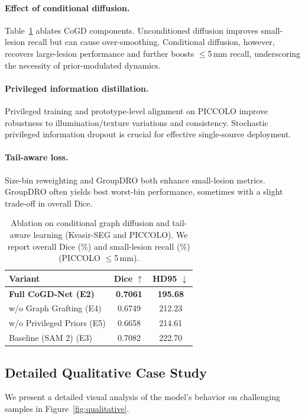 \documentclass{article}
\begin{document}
\paragraph{Effect of conditional diffusion.}
Table~\ref{tab:ablation_diffusion} ablates CoGD components. Unconditioned diffusion improves small-lesion recall but can cause over-smoothing. Conditional diffusion, however, recovers large-lesion performance and further boosts $\leq$5\,mm recall, underscoring the necessity of prior-modulated dynamics.

\paragraph{Privileged information distillation.}
Privileged training and prototype-level alignment on PICCOLO improve robustness to illumination/texture variations and consistency. Stochastic privileged information dropout is crucial for effective single-source deployment.

\paragraph{Tail-aware loss.}
Size-bin reweighting and GroupDRO \cite{Sagawa2020GroupDRO} both enhance small-lesion metrics. GroupDRO often yields best worst-bin performance, sometimes with a slight trade-off in overall Dice.

\begin{table}[t]
\centering
\small
\caption{Ablation on conditional graph diffusion and tail-aware learning (Kvasir-SEG and PICCOLO).
We report overall Dice (\%) and small-lesion recall (\%) (PICCOLO $\leq$5\,mm).}
\label{tab:ablation_diffusion}
\begin{tabularx}{\columnwidth}{Xcc}
\toprule
Variant & Dice $\uparrow$ & HD95 $\downarrow$ \\
\midrule
\textbf{Full CoGD-Net (E2)} & \textbf{0.7061} & \textbf{195.68} \\
w/o Graph Grafting (E4) & 0.6749 & 212.23 \\
w/o Privileged Priors (E5) & 0.6658 & 214.61 \\
Baseline (SAM 2) (E3) & 0.7082 & 222.70 \\
\bottomrule
\end{tabularx}
\end{table}

\subsection{Detailed Qualitative Case Study}
We present a detailed visual analysis of the model's behavior on challenging samples in Figure~\ref{fig:qualitative}.
\end{document}
